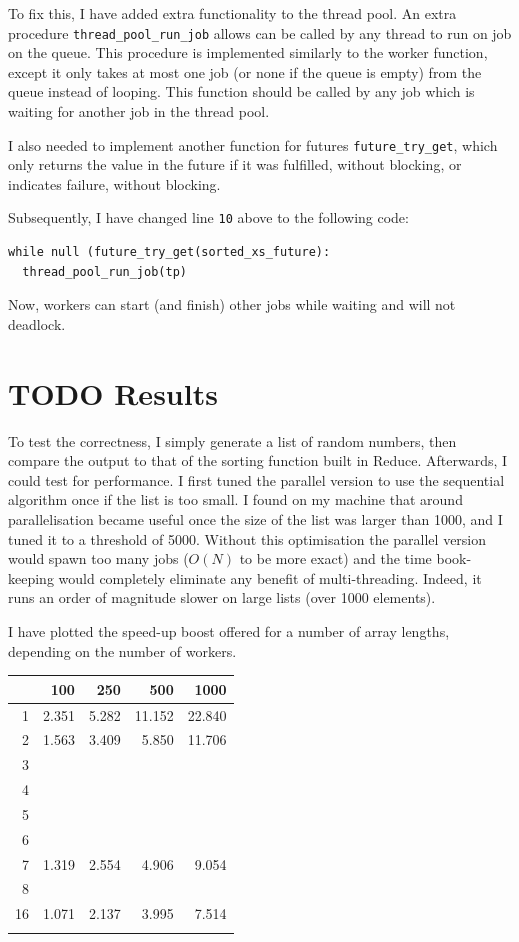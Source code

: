 To fix this, I have added extra functionality to the thread pool. An extra procedure \texttt{thread\_pool\_run\_job}
allows can be called by any thread to run on job on the queue. This procedure is implemented similarly
to the worker function, except it only takes at most one job (or none if the queue is empty) from the
queue instead of looping.
This function should be called by any job which is waiting for another job in the thread pool.

I also needed to implement another function for futures \texttt{future\_try\_get}, which only returns the
value in the future if it was fulfilled, without blocking, or indicates failure, without blocking.

Subsequently, I have changed line \texttt{10} above to the following code:
\begin{verbatim}
while null (future_try_get(sorted_xs_future):
  thread_pool_run_job(tp)
\end{verbatim}
Now, workers can start (and finish) other jobs while waiting and will not deadlock.

\section{{\bfseries\sffamily TODO} Results}

To test the correctness, I simply generate a list of random numbers, then compare the output
to that of the sorting function built in Reduce. Afterwards, I could test for performance.
I first tuned the parallel version to use the sequential algorithm once if the list is too
small. I found on my machine that around parallelisation became useful once the size of
the list was larger than 1000, and I tuned it to a threshold of 5000. Without this optimisation
the parallel version would spawn too many jobs (\(O(N)\) to be more exact) and the time book-keeping
would completely eliminate any benefit of multi-threading. Indeed, it runs an order of magnitude
slower on large lists (over 1000 elements).

I have plotted the speed-up boost offered for a number of array lengths, depending on the number
of workers.


\begin{center}
\begin{tabular}{rrrrr}
 & 100 & 250 & 500 & 1000\\
\hline
1 & 2.351 & 5.282 & 11.152 & 22.840\\
2 & 1.563 & 3.409 & 5.850 & 11.706\\
3 &  &  &  & \\
4 &  &  &  & \\
5 &  &  &  & \\
6 &  &  &  & \\
7 & 1.319 & 2.554 & 4.906 & 9.054\\
8 &  &  &  & \\
16 & 1.071 & 2.137 & 3.995 & 7.514\\
 &  &  &  & \\
\end{tabular}
\end{center}




